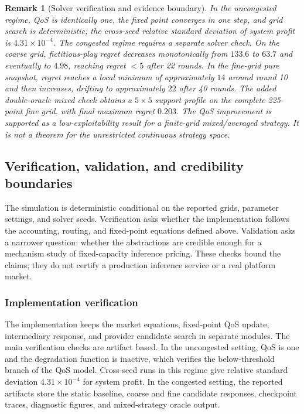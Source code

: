 \documentclass[11pt,a4paper]{article}
\newtheorem{remark}{Remark}
\begin{document}
\begin{remark}[Solver verification and evidence boundary]
In the uncongested regime, QoS is identically one, the fixed point converges in one step, and grid search is deterministic; the cross-seed relative standard deviation of system profit is $4.31\times10^{-4}$. The congested regime requires a separate solver check. On the coarse grid, fictitious-play regret decreases monotonically from $133.6$ to $63.7$ and eventually to $4.98$, reaching regret $<5$ after 22 rounds. In the fine-grid pure snapshot, regret reaches a local minimum of approximately $14$ around round 10 and then increases, drifting to approximately $22$ after 40 rounds. The added double-oracle mixed check obtains a $5\times5$ support profile on the complete 225-point fine grid, with final maximum regret $0.203$. The QoS improvement is supported as a low-exploitability result for a finite-grid mixed/averaged strategy. It is not a theorem for the unrestricted continuous strategy space.
\end{remark}

\subsection{Verification, validation, and credibility boundaries}
\label{sec:vv}

The simulation is deterministic conditional on the reported grids, parameter settings, and solver seeds. Verification asks whether the implementation follows the accounting, routing, and fixed-point equations defined above. Validation asks a narrower question: whether the abstractions are credible enough for a mechanism study of fixed-capacity inference pricing. These checks bound the claims; they do not certify a production inference service or a real platform market.

\subsubsection{Implementation verification}

The implementation keeps the market equations, fixed-point QoS update, intermediary response, and provider candidate search in separate modules. The main verification checks are artifact based. In the uncongested setting, QoS is one and the degradation function is inactive, which verifies the below-threshold branch of the QoS model. Cross-seed runs in this regime give relative standard deviation $4.31\times10^{-4}$ for system profit. In the congested setting, the reported artifacts store the static baseline, coarse and fine candidate responses, checkpoint traces, diagnostic figures, and mixed-strategy oracle output.
\end{document}
